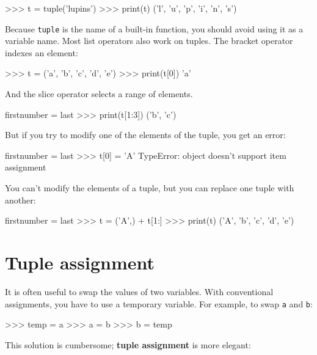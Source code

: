 \beforeverb
\begin{pycode}
>>> t = tuple('lupins')
>>> print(t)
('l', 'u', 'p', 'i', 'n', 's')
\end{pycode}
\afterverb
%
Because {\tt tuple} is the name of a built-in function, you should
avoid using it as a variable name.
Most list operators also work on tuples.  The bracket operator
indexes an element:


\beforeverb
\begin{pycode}
>>> t = ('a', 'b', 'c', 'd', 'e')
>>> print(t[0])
'a'
\end{pycode}
\afterverb
%
And the slice operator selects a range of elements.


\beforeverb
\begin{pycode*}{firstnumber = last}
>>> print(t[1:3])
('b', 'c')
\end{pycode*}
\afterverb
%
But if you try to modify one of the elements of the tuple, you get
an error:


\beforeverb
\begin{pycode*}{firstnumber = last}
>>> t[0] = 'A'
TypeError: object doesn't support item assignment
\end{pycode*}
\afterverb
%
You can't modify the elements of a tuple, but you can replace
one tuple with another:

\beforeverb
\begin{pycode*}{firstnumber = last}
>>> t = ('A',) + t[1:]
>>> print(t)
('A', 'b', 'c', 'd', 'e')
\end{pycode*}
\afterverb
%

\section{Tuple assignment}
\label{tuple assignment}


It is often useful to swap the values of two variables.
With conventional assignments, you have to use a temporary
variable.  For example, to swap {\tt a} and {\tt b}:

\beforeverb
\begin{pycode}
>>> temp = a
>>> a = b
>>> b = temp
\end{pycode}
\afterverb
%
This solution is cumbersome; {\bf tuple assignment} is more elegant:

